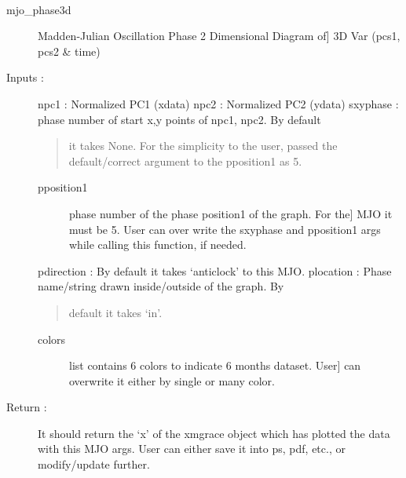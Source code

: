 \documentclass[letterpaper,10pt,english]{sphinxmanual}
\begin{document}
\begin{fulllineitems}
\label{mjo:phase3d.mjo_phase3d}~\begin{description}
\item[{mjo\_phase3d}] \leavevmode{[}Madden-Julian Oscillation Phase 2 Dimensional Diagram of{]}
3D Var (pcs1, pcs2 \& time)

\item[{Inputs :}] \leavevmode
npc1 : Normalized PC1 (xdata)
npc2 : Normalized PC2 (ydata)
sxyphase : phase number of start x,y points of npc1, npc2. By default
\begin{quote}

it takes None. For the simplicity to the user, passed the
default/correct argument to the pposition1 as 5.
\end{quote}
\begin{description}
\item[{pposition1}] \leavevmode{[}phase number of the phase position1 of the graph. For the{]}
MJO it must be 5. User can over write the sxyphase and
pposition1 args while calling this function, if needed.

\end{description}

pdirection : By default it takes `anticlock' to this MJO.
plocation : Phase name/string drawn inside/outside of the graph. By
\begin{quote}

default it takes `in'.
\end{quote}
\begin{description}
\item[{colors}] \leavevmode{[}list contains 6 colors to indicate 6 months dataset. User{]}
can overwrite it either by single or many color.

\end{description}

\item[{Return :}] \leavevmode
It should return the `x' of the xmgrace object which has plotted the
data with this MJO args. User can either save it into ps, pdf, etc.,
or modify/update further.


\end{description}
\end{fulllineitems}
\end{document}
